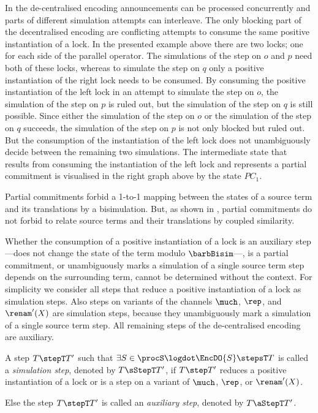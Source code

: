 \documentclass[]{eptcs}
\begin{document}
  In the de-centralised encoding announcements can be processed concurrently and parts of different simulation attempts can interleave. The only blocking part of the decentralised encoding are conflicting attempts to consume the same positive instantiation of a lock.
  In the presented example above there are two locks; one for each side of the parallel operator. The simulations of the step on $ o $ and $ p $ need both of these locks, whereas to simulate the step on $ q $ only a positive instantiation of the right lock needs to be consumed.
  By consuming the positive instantiation of the left lock in an attempt to simulate the step on $ o $, the simulation of the step on $ p $ is ruled out, but the simulation of the step on $ q $ is still possible. Since either the simulation of the step on $ o $ or the simulation of the step on $ q $ succeeds, the simulation of the step on $ p $ is not only blocked but ruled out. But the consumption of the instantiation of the left lock does not unambiguously decide between the remaining two simulations. The intermediate state that results from consuming the instantiation of the left lock and represents a partial commitment is visualised in the right graph above by the state $ PC_1 $.

  Partial commitments forbid a 1-to-1 mapping between the states of  a source term and its translations by a bisimulation. But, as shown in \cite{parrowCoupled92}, partial commitments do not forbid to relate source terms and their translations by coupled similarity.

Whether the consumption of a positive instantiation of a lock is an auxiliary step---does not change the state of the term modulo $ \barbBisim $---, is a partial commitment, or unambiguously marks a simulation of a single source term step depends on the surrounding term, \ie cannot be determined without the context. For simplicity we consider all steps that reduce a positive instantiation of a lock as simulation steps.
Also steps on variants of the channels $ \much $, $ \rep $, and $ \renam'(X) $ are simulation steps, because they unambiguously mark a simulation of a single source term step. All remaining steps of the de-centralised encoding are auxiliary.

\begin{definition}
	A step $ T \stepT T' $ such that $ \exists S \in \procS\logdot \EncDO{S} \stepsT T $ is called a \emph{simulation step}, denoted by $ T \sStepT T' $, if $ T \step T' $ reduces a positive instantiation of a lock or is a step on a variant of $ \much $, $ \rep $, or $ \renam'(X) $.
	
	Else the step $ T \stepT T' $ is called an \emph{auxiliary step}, denoted by $ T \aStepT T' $.
	\label{def:auxStepsDecentral}
\end{definition}
\end{document}
